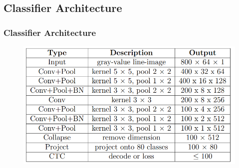 \subsection{Classifier Architecture}
\begin{frame}
    \frametitle{Classifier Architecture}
    \begin{figure}[!h]
        \centering
        \includegraphics[scale=0.6]{images/clas.png}
    \end{figure}
\end{frame}